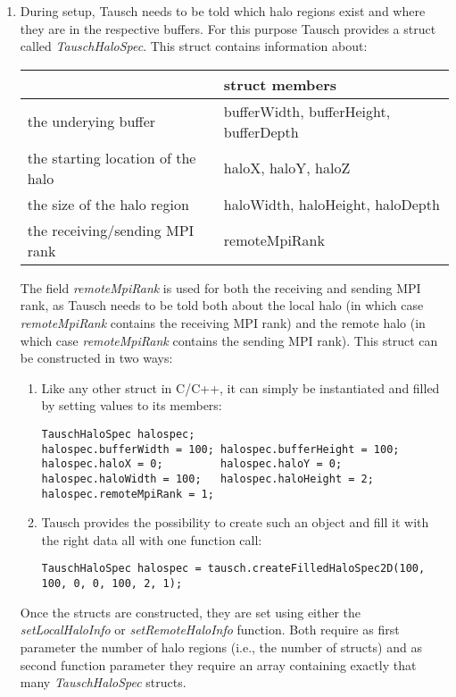 \documentclass{article}
\begin{document}
\begin{enumerate}
    \item During setup, Tausch needs to be told which halo regions exist and where they are in the respective buffers. For this purpose Tausch provides a struct called \emph{TauschHaloSpec}. This struct contains information about:
    \begin{table}[ht]\centering
    \begin{tabular}{|l|l|}
        \hline
        \rowcolor{black!10}
        & \bfseries struct members\\
        \hline
        the underying buffer & bufferWidth, bufferHeight, bufferDepth\\
        the starting location of the halo & haloX, haloY, haloZ\\
        the size of the halo region & haloWidth, haloHeight, haloDepth\\
        the receiving/sending MPI rank & remoteMpiRank\\
        \hline
    \end{tabular}
    \end{table}

    The field \emph{remoteMpiRank} is used for both the receiving and sending MPI rank, as Tausch needs to be told both about the local halo (in which case \emph{remoteMpiRank} contains the receiving MPI rank) and the remote halo (in which case \emph{remoteMpiRank} contains the sending MPI rank). This struct can be constructed in two ways:
    \begin{enumerate}
        \item Like any other struct in C/C++, it can simply be instantiated and filled by setting values to its members:
        \begin{lstlisting}
TauschHaloSpec halospec;
halospec.bufferWidth = 100; halospec.bufferHeight = 100;
halospec.haloX = 0;         halospec.haloY = 0;
halospec.haloWidth = 100;   halospec.haloHeight = 2;
halospec.remoteMpiRank = 1;
        \end{lstlisting}
        \item Tausch provides the possibility to create such an object and fill it with the right data all with one function call:
        \begin{lstlisting}
TauschHaloSpec halospec = tausch.createFilledHaloSpec2D(100, 100, 0, 0, 100, 2, 1);
        \end{lstlisting}
    \end{enumerate}

    Once the structs are constructed, they are set using either the \emph{setLocalHaloInfo} or \emph{setRemoteHaloInfo} function. Both require as first parameter the number of halo regions (i.e., the number of structs) and as second function parameter they require an array containing exactly that many \emph{TauschHaloSpec} structs.


\end{enumerate}
\end{document}
